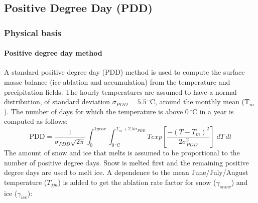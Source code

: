 
\subsection{Positive Degree Day (PDD)} \label{sec:using-issm-parameterization-pdd}

\subsubsection{Physical basis}
\paragraph{Positive degree day method}
A standard positive degree day (PDD) method is used to compute the surface masse balance (ice ablation and accumulation) from the temperature and precipitation fields. The hourly temperatures are assumed to have a normal distribution, of standard deviation $\sigma_{PDD} = 5.5\,^{\circ}\mathrm{C}$, around the monthly mean (T$_m$). The number of days for which the temperature is above $0\,^{\circ}\mathrm{C}$ in a year is computed as follows:
\begin{equation}
	\text{PDD} =
	\frac{1}{\sigma_{PDD}\sqrt{2\pi}}\int_{0}^{1year}\int_{0\,^{\circ}\mathrm{C}}^{T_m+2.5\sigma_{PDD}}
	T exp\left[\frac{-(T-T_m)^2}{2\sigma_{PDD}^2} \right] \;dT\,dt
\end{equation}
The amount of snow and ice that melts is assumed to be proportional to the number of positive degree days. Snow is melted first and the remaining positive degree days are used to melt ice. A dependence to the mean June/July/August temperature ($T_{jja}$) is added to get the ablation rate factor for snow ($\gamma_{snow}$) and ice ($\gamma_{ice}$):
